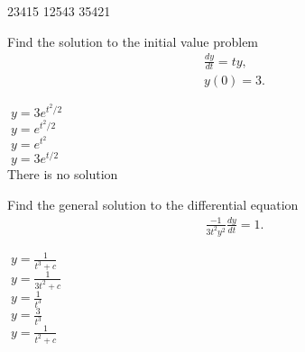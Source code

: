 \documentclass[12pt]{amsart}
\begin{document}
\runType[final]


\begin{answersheetmatter}[final]
\whichCourse[Math. 165]
\whichExam[Midterm 1]
\dateOfExam[10/11/2012]

\begin{multiplechoiceStyle}[dotted]%
 23415
 12543
 35421
\end{multiplechoiceStyle}
\end{answersheetmatter}



\makeanswersheet[]
\begin{exam}

\multiplechoiceStart[5 pts.]

\begin{problem}
  Find the solution to the initial value problem
  \begin{gather*}
  \frac{dy}{dt} = ty,
  \\
y(0) = 3.
  \end{gather*}
%
\begin{answers}{1}
$\;y = 3e^{t^{2}/2}$ \\
$\;y=e^{t^{2}/2}$ \\
$\;y=e^{t^{2}}$ \\
$\;y=3e^{t/2}$ \\
There is no solution\\
\end{answers}
\end{problem}


\begin{problem}
 Find the general solution to the differential equation
  \begin{gather*}
 \frac{-1}{3t^{2} y^{2}} \frac{dy}{dt} = 1.
  \end{gather*}
%
\begin{answers}{1}
$\;y = \frac{1}{t^{3} + c}$ \\
$\;y=\frac{1}{3t^{2} + c}$ \\
$\;y=\frac{1}{t^{3}}$ \\
$\;y=\frac{3}{t^{3}}$ \\
$\;y = \frac{1}{t^{2} + c}$ \\
\end{answers}
\end{problem}


\end{exam}
\end{document}
